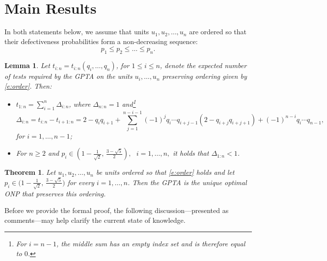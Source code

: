 \documentclass[12pt]{article}
\newtheorem{thm}{Theorem}
\newtheorem{lem}{Lemma}
\begin{document}
\section{Main Results}
In both statements below, we assume that units $u_1,u_2,\dots,u_n$ are ordered so that their defectiveness probabilities form a non-decreasing sequence:
\begin{equation}\label{e:order}
    p_1\leq p_2\leq\dots\leq p_n.
\end{equation}
\begin{lem}\label{l:GPTP_mean}
Let \( t_{i:n} = t_{i:n}(q_i, \dots, q_n) \), for \( 1 \leq i \leq n \), denote the expected number of tests required by the GPTA on the units \( u_i, \dots, u_n \) preserving ordering given by \eqref{e:order}. Then:
\begin{itemize}
    \item[(i)] \( t_{1:n} = \sum_{i=1}^n \Delta_{i:n} \), where \( \Delta_{n:n} = 1 \) and\footnote{For \( i = n-1 \), the middle sum has an empty index set and is therefore equal to \( 0 \).}
    \begin{equation*}\label{e:delta_expression}
        \Delta_{i:n} = t_{i:n} - t_{i+1:n} = 2 - q_i q_{i+1} + \sum_{j=1}^{n - i - 1} (-1)^j q_i \cdots q_{i + j - 1} \left( 2 - q_{i + j} q_{i + j + 1} \right) + (-1)^{n - i} q_i \cdots q_{n - 1},
    \end{equation*}
    for \( i = 1, \dots, n - 1 \);

    \item[(ii)] For \( n \geq 2 \) and
    \(
    p_i \in \left( 1 - \frac{1}{\sqrt{2}},\, \frac{3 - \sqrt{5}}{2} \right),\,\,\,\, i = 1, \ldots, n,
    \)
    it holds that \( \Delta_{1:n} < 1 \).
\end{itemize}
\end{lem}

\begin{thm}\label{t:main}
Let \(u_1,u_2,\ldots,u_n\) be units ordered so that \eqref{e:order} holds and let
\(
p_i \in \bigl(1 - \frac{1}{\sqrt{2}},\, \frac{3 - \sqrt{5}}{2}\bigr)
\)
for every \(i = 1,\dots,n\).
Then the {GPTA} is the \emph{unique optimal} ONP that preserves this ordering.
\end{thm}


Before we provide the formal proof, the following discussion—presented as comments—may help clarify the current state of knowledge.
\end{document}

